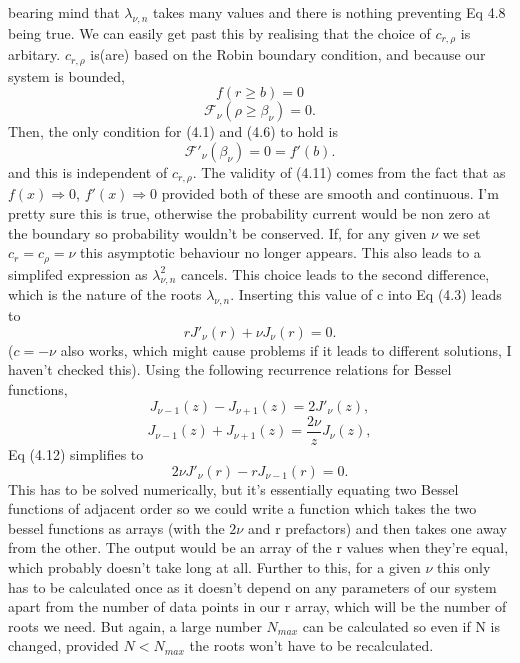 \documentclass[10pt]{article}
\numberwithin{equation}{section}
\begin{document}
\begin{multicols}{2}
\begin{equation}
\end{equation}
bearing mind that $\lambda_{\nu,n}$ takes many values and there is nothing preventing Eq 4.8 being true. We can easily get past this by realising that the choice of $c_{r,\rho}$ is arbitary. $c_{r,\rho}$ is(are) based on the Robin boundary condition, and because our system is bounded, 
\begin{equation}
f(r\geqslant b) = 0
\end{equation}
\begin{equation}
\mathcal{F}_{\nu}(\rho\geqslant\beta_{\nu}) = 0.
\end{equation}
Then, the only condition for (4.1) and (4.6) to hold is
\begin{equation}
 \mathcal{F}'_{\nu}(\beta_{\nu}) = 0 = f'(b).
\end{equation}
and this is independent of $c_{r,\rho}$. The validity of (4.11) comes from the fact that as $f(x)\Rightarrow0$, $f'(x)\Rightarrow0$ provided both of these are smooth and continuous. I'm pretty sure this is true, otherwise the probability current would be non zero at the boundary so probability wouldn't be conserved. If, for any given $\nu$ we set $c_{r}=c_{\rho}=\nu$ this asymptotic behaviour no longer appears. This also leads to a simplifed expression as $\lambda^{2}_{\nu,n}$ cancels. This choice leads to the second difference, which is the nature of the roots $\lambda_{\nu,n}$. Inserting this value of c into Eq (4.3) leads to
\begin{equation}
rJ'_{\nu}(r)+\nu J_{\nu}(r)=0.
\end{equation}
($c = -\nu$ also works, which might cause problems if it leads to different solutions, I haven't checked this).
Using the following recurrence relations for Bessel functions,
\begin{equation}
J_{\nu-1}(z)-J_{\nu+1}(z) = 2J'_{\nu}(z),
\end{equation}
\begin{equation}
J_{\nu-1}(z)+J_{\nu+1}(z) = \frac{2\nu}{z}J_{\nu}(z),
\end{equation}
Eq (4.12) simplifies to 
\begin{equation}
2\nu J'_{\nu}(r)-rJ_{\nu-1}(r)=0.
\end{equation}
This has to be solved numerically, but it's essentially equating two Bessel functions of adjacent order so we could write a function which takes the two bessel functions as arrays (with the $2\nu$ and r prefactors) and then takes one away from the other. The output would be an array of the r values when they're equal, which probably doesn't take long at all. Further to this, for a given $\nu$ this only has to be calculated once as it doesn't depend on any parameters of our system apart from the number of data points in our r array, which will be the number of roots we need. But again, a large number $N_{max}$ can be calculated so even if N is changed, provided $N<N_{max}$ the roots won't have to be recalculated.


\end{multicols}
\end{document}
